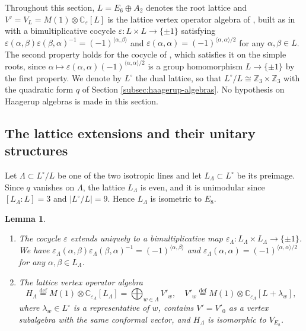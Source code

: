 \documentclass[leqno]{article}
\newcommand{\Cbb}{\ensuremath{\mathbb{C}}}
\newcommand{\Z}{\ensuremath{\mathbb{Z}}}
\newcommand{\co}{\colon}
\newcommand{\ot}{\otimes}
\newcommand{\ov}{\overset}
\newcommand{\epsi}{\varepsilon}
\newtheorem{lemma}[thm]{Lemma}
\numberwithin{equation}{section}
\begin{document}
Throughout this section, $L = E_6 \oplus A_2$ denotes the root lattice and $V' = V_L = M(1) \ot \Cbb_\epsi[L]$ is the lattice vertex operator algebra of \cite[Section 10]{Arh26}, built as in \cite[Chapter 8]{FLM88} with a bimultiplicative cocycle $\epsi \co L \times L \to \{\pm 1\}$ satisfying $\epsi(\alpha,\beta)\epsi(\beta,\alpha)^{-1} = (-1)^{\langle \alpha,\beta\rangle}$ and $\epsi(\alpha,\alpha) = (-1)^{\langle\alpha,\alpha\rangle/2}$ for any $\alpha, \beta \in L$. The second property holds for the cocycle of \cite[Section 10.1]{Arh26}, which satisfies it on the simple roots, since $\alpha \mapsto \epsi(\alpha,\alpha)(-1)^{\langle\alpha,\alpha\rangle/2}$ is a group homomorphism $L \to \{\pm 1\}$ by the first property. We denote by $L^\circ$ the dual lattice, so that $L^\circ/L \cong \Z_3 \times \Z_3$ with the quadratic form $q$ of Section \ref{subsec:haagerup-algebras}. No hypothesis on Haagerup algebras is made in this section.

\subsection{The lattice extensions and their unitary structures}
\label{subsec:lattice-extensions}

Let $\Lambda \subset L^\circ/L$ be one of the two isotropic lines and let $L_\Lambda \subset L^\circ$ be its preimage. Since $q$ vanishes on $\Lambda$, the lattice $L_\Lambda$ is even, and it is unimodular since $[L_\Lambda : L] = 3$ and $|L^\circ/L| = 9$. Hence $L_\Lambda$ is isometric to $E_8$.

\begin{lemma}
\label{lem:cocycle}
\begin{enumerate}
\item The cocycle $\epsi$ extends uniquely to a bimultiplicative map $\epsi_\Lambda \co L_\Lambda \times L_\Lambda \to \{\pm 1\}$. We have $\epsi_\Lambda(\alpha,\beta)\epsi_\Lambda(\beta,\alpha)^{-1} = (-1)^{\langle \alpha,\beta\rangle}$ and $\epsi_\Lambda(\alpha,\alpha) = (-1)^{\langle\alpha,\alpha\rangle/2}$ for any $\alpha,\beta \in L_\Lambda$.
\item The lattice vertex operator algebra
\[
H_\Lambda \ov{\mathrm{def}}{=} M(1) \ot \Cbb_{\epsi_\Lambda}[L_\Lambda] = \bigoplus_{w \in \Lambda} V'_w,\quad V'_w \ov{\mathrm{def}}{=} M(1) \ot \Cbb_{\epsi_\Lambda}[L+\lambda_w],
\]
where $\lambda_w \in L^\circ$ is a representative of $w$, contains $V' = V'_0$ as a vertex subalgebra with the same conformal vector, and $H_\Lambda$ is isomorphic to $V_{E_8}$.
\end{enumerate}
\end{lemma}
\end{document}
